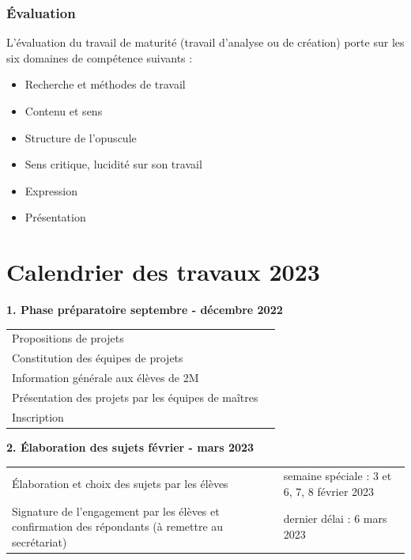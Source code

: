 \documentclass[
  10pt,
  french,
  a5paper,
  openany]{book}
\providecommand{\tightlist}{%
  \setlength{\itemsep}{0pt}\setlength{\parskip}{0pt}}
\begin{document}
\hypertarget{uxe9valuation-1}{%
\subsection*{Évaluation}\label{uxe9valuation-1}}

L'évaluation du travail de maturité (travail d'analyse ou de création) porte sur les six domaines de compétence suivants :

\begin{itemize}
\tightlist
\item
  Recherche et méthodes de travail
\item
  Contenu et sens
\item
  Structure de l'opuscule
\item
  Sens critique, lucidité sur son travail
\item
  Expression
\item
  Présentation
\end{itemize}

\hypertarget{calendrier-des-travaux-2023}{%
\chapter*{Calendrier des travaux 2023}\label{calendrier-des-travaux-2023}}


\textbf{1. Phase préparatoire \hfill septembre - décembre 2022}

\begin{longtable}[]{@{}ll@{}}
\toprule
\endhead
Propositions de projets &\tabularnewline
Constitution des équipes de projets &\tabularnewline
Information générale aux élèves de 2M &\tabularnewline
Présentation des projets par les équipes de maîtres &\tabularnewline
Inscription &\tabularnewline
\bottomrule
\end{longtable}


\textbf{2. Élaboration des sujets \hfill février - mars 2023}

\begin{longtable}[]{@{}ll@{}}
\toprule
\endhead
\begin{minipage}[t]{0.65\columnwidth}\raggedright
Élaboration et choix des sujets par les élèves\strut
\end{minipage} & \begin{minipage}[t]{0.29\columnwidth}\raggedright
semaine spéciale : 3 et 6, 7, 8 février 2023\strut
\end{minipage}\tabularnewline
\begin{minipage}[t]{0.65\columnwidth}\raggedright
Signature de l'engagement par les élèves et confirmation des répondants (à remettre au secrétariat)\strut
\end{minipage} & \begin{minipage}[t]{0.29\columnwidth}\raggedright
dernier délai : 6 mars 2023\strut
\end{minipage}\tabularnewline
\bottomrule
\end{longtable}
\end{document}
